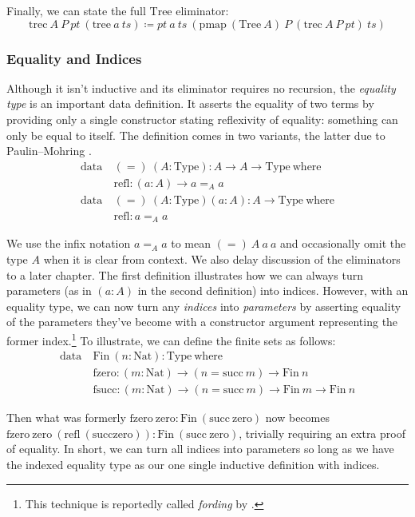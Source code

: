 \documentclass{report}
\newcommand{\Nat}{\const{Nat}}
\newcommand{\zero}{\const{zero}}
\renewcommand{\succ}{\const{succ}}
\newcommand{\Tree}{\const{Tree}}
\newcommand{\tree}{\const{tree}}
\newcommand{\Fin}{\const{Fin}}
\newcommand{\fzero}{\const{fzero}}
\newcommand{\fsucc}{\const{fsucc}}
\newcommand{\const}[1]{\text{#1}}
\newcommand{\data}{\const{data}}
\newcommand{\Type}{\const{Type}}
\newcommand{\where}{\const{where}}
\newcommand{\refl}{\const{refl}}
\begin{document}
Finally, we can state the full $\Tree$ eliminator:
%
\begin{displaymath}
    \const{trec} ~ A ~ P ~ pt ~ (\tree ~ a ~ ts) \coloneqq pt ~ a ~ ts ~ (\const{pmap} ~ (\Tree ~ A) ~ P ~ (\const{trec} ~ A ~ P ~ pt) ~ ts)
\end{displaymath}

\subsubsection{Equality and Indices}

Although it isn't inductive and its eliminator requires no recursion, the \emph{equality type} is an important data definition. It asserts the equality of two terms by providing only a single constructor stating reflexivity of equality: something can only be equal to itself. The definition comes in two variants, the latter due to Paulin--Mohring \citep{jk-hott}.
%
\begin{align*}
    \data ~ &(=) ~ (A: \Type): A \to A \to \Type ~ \where \\
    &\refl: (a: A) \to a =_A a \\
    \data ~ &(=) ~ (A: \Type) (a: A): A \to \Type ~ \where \\
    &\refl: a =_A a
\end{align*}

We use the infix notation $a =_A a$ to mean $(=) ~ A ~ a ~ a$ and occasionally omit the type $A$ when it is clear from context. We also delay discussion of the eliminators to a later chapter. The first definition illustrates how we can always turn parameters (as in $(a: A)$ in the second definition) into indices. However, with an equality type, we can now turn any \emph{indices} into \emph{parameters} by asserting equality of the parameters they've become with a constructor argument representing the former index.\footnote{This technique is reportedly \citep{frex} called \emph{fording} by \citet{mcbride-phd}.} To illustrate, we can define the finite sets as follows:
%
\begin{align*}
    \data ~ &\Fin ~ (n: \Nat): \Type ~ \where \\
    &\fzero: (m: \Nat) \to (n = \succ ~ m) \to \Fin ~ n \\
    &\fsucc: (m: \Nat) \to (n = \succ ~ m) \to \Fin ~ m \to \Fin ~ n
\end{align*}

Then what was formerly $\fzero ~ \zero: \Fin ~ (\succ ~ \zero)$ now becomes $\fzero ~ \zero ~ (\refl ~ (\succ \zero)): \Fin ~ (\succ ~ \zero)$, trivially requiring an extra proof of equality. In short, we can turn all indices into parameters so long as we have the indexed equality type as our one single inductive definition with indices.
\end{document}

